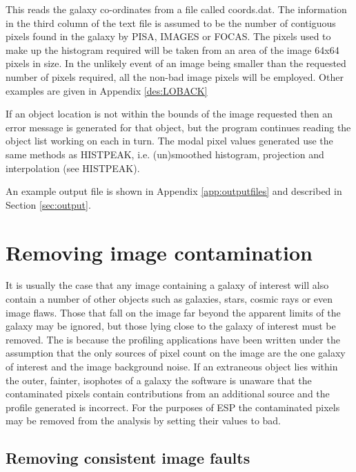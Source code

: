 \documentclass[twoside,11pt]{article}
\newcommand{\xref}[3]{#1}
\begin{document}
This reads the galaxy co-ordinates from a file called coords.dat. The
information in the third column of the text file is assumed to be the
number of contiguous pixels found in the galaxy by \xref{PISA}{sun109}{},
IMAGES or FOCAS. The
pixels used to make up the histogram required will be taken from an
area of the image 64x64 pixels in size. In the unlikely event
of an image being smaller than the requested number of pixels required,
all the non-bad image pixels will be employed. Other examples are given in
Appendix \ref{des:LOBACK}

If an object location
is not within the bounds of the image requested then an
error message is generated for that object, but the program continues
reading the object list working on each in turn. The modal pixel values
generated use the same methods as HISTPEAK, i.e. (un)smoothed histogram,
projection and interpolation (see HISTPEAK).

An example output file is shown in
Appendix \ref{app:outputfiles}
and described in
Section \ref{sec:output}.


\section{Removing image contamination}
\label{sec:removi}

It is usually the case that any image containing a galaxy of interest will
also contain a number of other objects such as galaxies, stars, cosmic rays
or even image flaws.
Those that fall on the image far beyond the apparent limits of the
galaxy may be ignored, but those lying close
to the galaxy of interest must be
removed. The is because the profiling applications have been
written under the assumption that the only sources of pixel count
on the image are the one galaxy of interest and the image background noise.
If an extraneous object lies within the outer, fainter, isophotes of a galaxy
the software is unaware that the contaminated pixels contain
contributions from an additional source and the profile generated is incorrect.
For the purposes of ESP the contaminated pixels may be removed from the
analysis by setting their values to bad.

\subsection{Removing consistent image faults}
\end{document}
